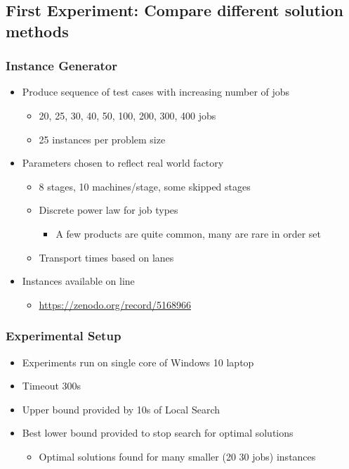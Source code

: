 \subsection{First Experiment: Compare different solution methods}

\begin{frame}
\frametitle{Instance Generator}
\begin{itemize}
\item Produce sequence of test cases with increasing number of jobs
\begin{itemize}
\item 20, 25, 30, 40, 50, 100, 200, 300, 400 jobs
\item 25 instances per problem size
\end{itemize}

\item Parameters chosen to reflect real world factory
\begin{itemize}
\item 8 stages, 10 machines/stage, some skipped stages
\item Discrete power law for job types
\begin{itemize}
\item A few products are quite common, many are rare in order set
\end{itemize}
\item Transport times based on lanes
\end{itemize}

\item Instances available on line
\begin{itemize}
\item \url{https://zenodo.org/record/5168966}
\end{itemize}

\end{itemize}
\end{frame}

\begin{frame}
\frametitle{Experimental Setup}
\begin{itemize}
\item Experiments run on single core of Windows 10 laptop

\item Timeout 300s

\item Upper bound provided by 10s of Local Search

\item Best lower bound provided to stop search for optimal solutions
\begin{itemize}
\item Optimal solutions found for many smaller (20 30 jobs) instances
\end{itemize}

\end{itemize}
\end{frame}

